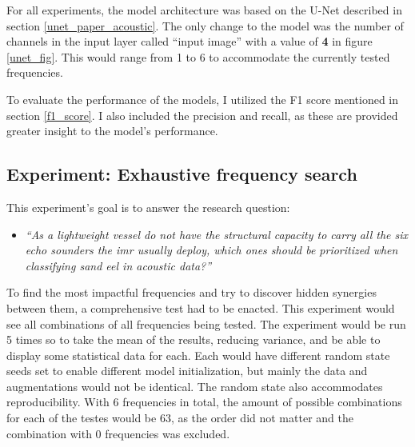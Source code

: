         
        For all experiments, the model architecture was based on the U-Net described in section \ref{unet_paper_acoustic}. The only change to the model was the number of channels in the input layer called “input image” with a value of \textbf{4} in figure \ref{unet_fig}. This would range from 1 to 6 to accommodate the currently tested frequencies.
        
        To evaluate the performance of the models, I utilized the F1 score mentioned in section \ref{f1_score}. I also included the precision and recall, as these are provided greater insight to the model's performance.
        
    
    \subsection{Experiment: Exhaustive frequency search}
        This experiment's goal is to answer the research question:
        \begin{itemize}
            \item \textit{“As a lightweight vessel do not have the structural capacity to carry all the six echo sounders the \gls{imr} usually deploy, which ones should be prioritized when classifying sand eel in acoustic data?”}
        \end{itemize}
    
        To find the most impactful frequencies and try to discover hidden synergies between them, a comprehensive test had to be enacted. This experiment would see all combinations of all frequencies being tested. The experiment would be run 5 times so to take the mean of the results,  reducing variance, and be able to display some statistical data for each. Each would have different random state seeds set to enable different model initialization, but mainly the data and augmentations would not be identical. The random state also accommodates reproducibility. With 6 frequencies in total, the amount of possible combinations for each of the testes would be 63, as the order did not matter and the combination with 0 frequencies was excluded.
        
